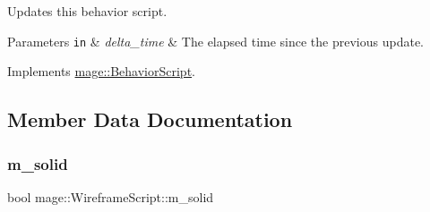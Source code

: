 Updates this behavior script.


\begin{DoxyParams}[1]{Parameters}
\mbox{\tt in}  & {\em delta\+\_\+time} & The elapsed time since the previous update. \\
\hline
\end{DoxyParams}


Implements \hyperlink{classmage_1_1_behavior_script_a905b6c83640cb91d19fecab3435f6feb}{mage\+::\+Behavior\+Script}.



\subsection{Member Data Documentation}
\hypertarget{classmage_1_1_wireframe_script_a5e038a5e1615ab9323132a3e0a228a82}{}\label{classmage_1_1_wireframe_script_a5e038a5e1615ab9323132a3e0a228a82} 
\subsubsection{\texorpdfstring{m\+\_\+solid}{m\_solid}}
{\footnotesize\ttfamily bool mage\+::\+Wireframe\+Script\+::m\+\_\+solid\hspace{0.3cm}{\ttfamily [private]}}

